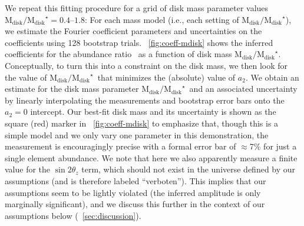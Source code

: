 \documentclass[modern]{aastex63}
\newcommand{\ofe}{\abunratio{O}{Fe}}
\newcommand{\mdisk}{\ensuremath{\mathrm{M}_\mathrm{disk}}}
\newcommand{\mratio}{\ensuremath{\mdisk / \mdisk^\star}}
\begin{document}
We repeat this fitting procedure for a grid of disk mass parameter values
$\mratio = 0.4$--$1.8$:
For each mass model (i.e., each setting of \mratio), we estimate the Fourier
coefficient parameters and uncertainties on the coefficients using 128 bootstrap
trials.
\figurename~\ref{fig:coeff-mdisk} shows the inferred coefficients for the
abundance ratio \ofe\ as a function of disk mass \mratio.
Conceptually, to turn this into a constraint on the disk mass, we then look for
the value of \mratio\ that minimizes the (absolute) value of $a_2$.
We obtain an estimate for the disk mass parameter \mratio\ and an associated
uncertainty by linearly interpolating the measurements and bootstrap error bars
onto the $a_2=0$ intercept.
Our best-fit disk mass and its uncertainty is shown as the square (red)
marker in \figurename~\ref{fig:coeff-mdisk} to emphasize that, though this is a
simple model and we only vary one parameter in this demonstration, the
measurement is encouragingly precise with a formal error bar of $\approx$7\% for
just a single element abundance.
We note that here we also apparently measure a finite value for the $\sin
2\theta_z$ term, which should not exist in the universe defined by our
assumptions (and is therefore labeled ``verboten'').
This implies that our assumptions seem to be lightly violated (the inferred
amplitude is only marginally significant), and we discuss this further in the
context of our assumptions below (\sectionname~\ref{sec:discussion}).
\end{document}
